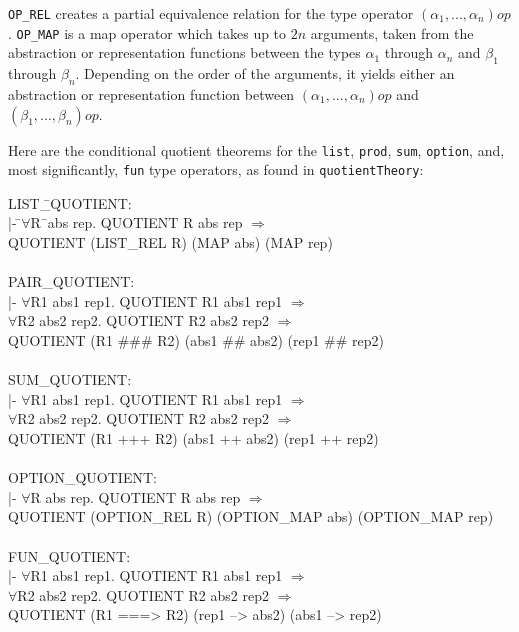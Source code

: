\documentclass[envcountsame,runningheads]{llncs}
\newcommand{\quotient}{partial equivalence}
\begin{document}
\noindent
{\tt OP\_REL} creates a \quotient{} relation for the type operator
$(\alpha_1,...,\alpha_n)op$.
{\tt OP\_MAP} is a map operator which takes up to $2n$ arguments,
taken from
the
abstraction or representation functions
between the types $\alpha_1$ through $\alpha_n$
and $\beta_1$ through $\beta_n$.
Depending on the order of the arguments, it
yields either an abstraction or representation function
between
$(\alpha_1,...,\alpha_n)op$
and $(\beta_1,...,\beta_n)op$.

Here are the conditional quotient theorems for the {\tt list}, {\tt prod},
{\tt sum}, {\tt option}, and, most significantly, {\tt fun} type operators,
as found in {\tt quotientTheory}:

{\tt \begin{tabbing}
LIST\=\_QUOTIENT: \\
\>  |- \=$\forall$R\= \ abs rep. QUOTIENT R abs rep $\Rightarrow$ \\
\>\>\>   QUOTIENT (LIST\_REL R) (MAP abs) (MAP rep) \\
\\
PAIR\_QUOTIENT: \\
\>  |- $\forall$R1 abs1 rep1. QUOTIENT R1 abs1 rep1 $\Rightarrow$ \\
\>\>   $\forall$R2 abs2 rep2. QUOTIENT R2 abs2 rep2 $\Rightarrow$ \\
\>\>\>   QUOTIENT (R1 \#\#\# R2) (abs1 \#\# abs2) (rep1 \#\# rep2) \\
\\
SUM\_QUOTIENT: \\
\>  |- $\forall$R1 abs1 rep1. QUOTIENT R1 abs1 rep1 $\Rightarrow$ \\
\>\>   $\forall$R2 abs2 rep2. QUOTIENT R2 abs2 rep2 $\Rightarrow$ \\
\>\>\>   QUOTIENT (R1 +++ R2) (abs1 ++ abs2) (rep1 ++ rep2) \\
\\
OPTION\_QUOTIENT: \\
\>  |- $\forall$R abs rep. QUOTIENT R abs rep $\Rightarrow$ \\
\>\>\>   QUOTIENT (OPTION\_REL R) (OPTION\_MAP abs) (OPTION\_MAP rep) \\
\\
FUN\_QUOTIENT: \\
\>  |- $\forall$R1 abs1 rep1. QUOTIENT R1 abs1 rep1 $\Rightarrow$ \\
\>\>   $\forall$R2 abs2 rep2. QUOTIENT R2 abs2 rep2 $\Rightarrow$ \\
\>\>\>   QUOTIENT (R1 ===> R2) (rep1 --> abs2) (abs1 --> rep2)
\end{tabbing}}
\end{document}
